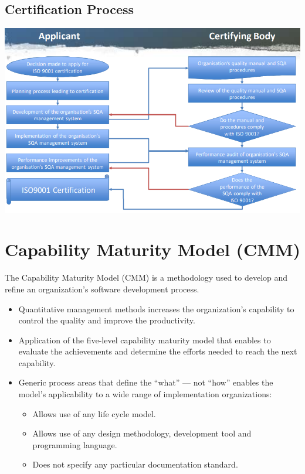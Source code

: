 \documentclass{article}
\begin{document}
\subsection{Certification Process}

\begin{center}
  \includegraphics[scale=0.5]{certification_process.png}
\end{center}

\section{Capability Maturity Model (CMM)}
\begin{flushleft}
The Capability Maturity Model (CMM) is a methodology used to develop and refine an organization's software development process.
\end{flushleft}
\begin{itemize}
  \item Quantitative management methods increases the organization's capability to control the quality and improve the productivity.
  \item Application of the five-level capability maturity model that enables to evaluate the achievements and determine the efforts needed to reach the next capability.
  \item Generic process areas that define the “what” — not “how” enables the model's applicability to a wide range of implementation organizations:
  \begin{itemize}
    \item Allows use of any life cycle model.
    \item Allows use of any design methodology, development tool and programming language.
    \item Does not specify any particular documentation standard.
  \end{itemize}
\end{itemize}
\end{document}
